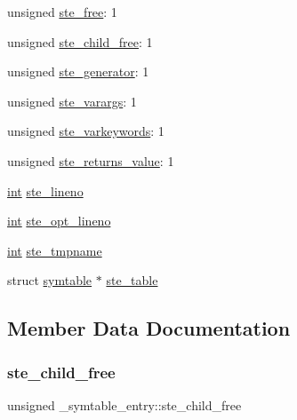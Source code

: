 \begin{DoxyCompactItemize}
\item 
unsigned \mbox{\hyperlink{struct__symtable__entry_ad9adb48b9bbb65e0978e7bbbc0ab28f4}{ste\+\_\+free}}\+: 1
\item 
unsigned \mbox{\hyperlink{struct__symtable__entry_a702e638b28c6cb34b4995d5ba9239cb3}{ste\+\_\+child\+\_\+free}}\+: 1
\item 
unsigned \mbox{\hyperlink{struct__symtable__entry_aa52a41915a93b8df3d29283bda786577}{ste\+\_\+generator}}\+: 1
\item 
unsigned \mbox{\hyperlink{struct__symtable__entry_a8c10d18a77ef271880c58c5024735675}{ste\+\_\+varargs}}\+: 1
\item 
unsigned \mbox{\hyperlink{struct__symtable__entry_adf09b37ba6e825fffd14244163b9e556}{ste\+\_\+varkeywords}}\+: 1
\item 
unsigned \mbox{\hyperlink{struct__symtable__entry_ae19032c58d983089cff8249a656a20d2}{ste\+\_\+returns\+\_\+value}}\+: 1
\item 
\mbox{\hyperlink{warnings_8h_a74f207b5aa4ba51c3a2ad59b219a423b}{int}} \mbox{\hyperlink{struct__symtable__entry_acb6b33690a6ef14df11c57993f16df35}{ste\+\_\+lineno}}
\item 
\mbox{\hyperlink{warnings_8h_a74f207b5aa4ba51c3a2ad59b219a423b}{int}} \mbox{\hyperlink{struct__symtable__entry_a577586ad1073e9827effb2a1307ae6ad}{ste\+\_\+opt\+\_\+lineno}}
\item 
\mbox{\hyperlink{warnings_8h_a74f207b5aa4ba51c3a2ad59b219a423b}{int}} \mbox{\hyperlink{struct__symtable__entry_acf3f6e0c57b25f389ee61ef9b546462b}{ste\+\_\+tmpname}}
\item 
struct \mbox{\hyperlink{structsymtable}{symtable}} $\ast$ \mbox{\hyperlink{struct__symtable__entry_a42ce617896ae1d9718d309d54dc0dd09}{ste\+\_\+table}}
\end{DoxyCompactItemize}


\subsection{Member Data Documentation}
\mbox{\label{struct__symtable__entry_a702e638b28c6cb34b4995d5ba9239cb3}} 
\subsubsection{\texorpdfstring{ste\_child\_free}{ste\_child\_free}}
{\footnotesize\ttfamily unsigned \+\_\+symtable\+\_\+entry\+::ste\+\_\+child\+\_\+free}

